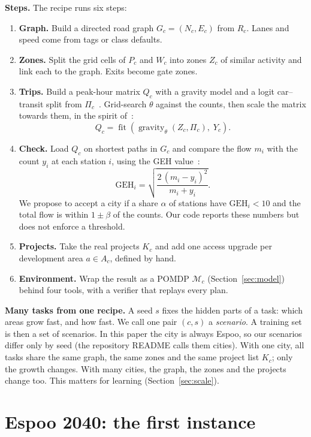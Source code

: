 \documentclass{article}
\begin{document}
\textbf{Steps.} The recipe runs six steps:
\begin{enumerate}
\item \textbf{Graph.} Build a directed road graph $G_c=(N_c,E_c)$ from $R_c$. Lanes and speed come from tags or class defaults.
\item \textbf{Zones.} Split the grid cells of $P_c$ and $W_c$ into zones $Z_c$ of similar activity and link each to the graph. Exits become gate zones.
\item \textbf{Trips.} Build a peak-hour matrix $Q_c$ with a gravity model and a logit car--transit split from $\Pi_c$~\cite{ortuzar2011}. Grid-search $\theta$ against the counts, then scale the matrix towards them, in the spirit of~\cite{vanzuylen1980}:
\begin{equation}
Q_c=\operatorname{fit}\left(\operatorname{gravity}_\theta(Z_c,\Pi_c),\;Y_c\right).
\end{equation}
\item \textbf{Check.} Load $Q_c$ on shortest paths in $G_c$ and compare the flow $m_i$ with the count $y_i$ at each station $i$, using the GEH value~\cite{dft2026}:
\begin{equation}
\text{GEH}_i=\sqrt{\frac{2\,(m_i-y_i)^2}{m_i+y_i}}.
\end{equation}
We propose to accept a city if a share $\alpha$ of stations have $\text{GEH}_i<10$ and the total flow is within $1\pm\beta$ of the counts. Our code reports these numbers but does not enforce a threshold.
\item \textbf{Projects.} Take the real projects $K_c$ and add one access upgrade per development area $a\in A_c$, defined by hand.
\item \textbf{Environment.} Wrap the result as a POMDP $\mathcal{M}_c$ (Section~\ref{sec:model}) behind four tools, with a verifier that replays every plan.
\end{enumerate}

\textbf{Many tasks from one recipe.} A seed $s$ fixes the hidden parts of a task: which areas grow fast, and how fast. We call one pair $(c,s)$ a \emph{scenario}. A training set is then a set of scenarios. In this paper the city is always Espoo, so our scenarios differ only by seed (the repository README calls them cities). With one city, all tasks share the same graph, the same zones and the same project list $K_c$; only the growth changes. With many cities, the graph, the zones and the projects change too. This matters for learning (Section~\ref{sec:scale}).

\section{Espoo 2040: the first instance}\label{sec:repo}
\end{document}
